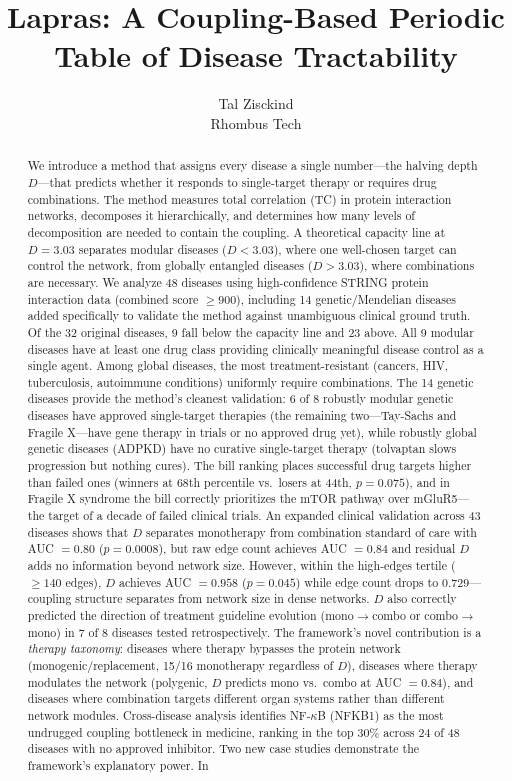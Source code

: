 \documentclass[11pt,a4paper]{article}
\title{\textbf{Lapras: A Coupling-Based Periodic Table of Disease Tractability}}
\author{Tal Zisckind\\Rhombus Tech}
\date{}
\begin{document}
\maketitle

\begin{abstract}
We introduce a method that assigns every disease a single number---the halving depth $D$---that predicts whether it responds to single-target therapy or requires drug combinations. The method measures total correlation (TC) in protein interaction networks, decomposes it hierarchically, and determines how many levels of decomposition are needed to contain the coupling. A theoretical capacity line at $D = 3.03$ separates modular diseases ($D < 3.03$), where one well-chosen target can control the network, from globally entangled diseases ($D > 3.03$), where combinations are necessary. We analyze 48 diseases using high-confidence STRING protein interaction data (combined score $\geq 900$), including 14 genetic/Mendelian diseases added specifically to validate the method against unambiguous clinical ground truth. Of the 32 original diseases, 9 fall below the capacity line and 23 above. All 9 modular diseases have at least one drug class providing clinically meaningful disease control as a single agent. Among global diseases, the most treatment-resistant (cancers, HIV, tuberculosis, autoimmune conditions) uniformly require combinations. The 14 genetic diseases provide the method's cleanest validation: 6 of 8 robustly modular genetic diseases have approved single-target therapies (the remaining two---Tay-Sachs and Fragile X---have gene therapy in trials or no approved drug yet), while robustly global genetic diseases (ADPKD) have no curative single-target therapy (tolvaptan slows progression but nothing cures). The bill ranking places successful drug targets higher than failed ones (winners at 68th percentile vs.\ losers at 44th, $p = 0.075$), and in Fragile X syndrome the bill correctly prioritizes the mTOR pathway over mGluR5---the target of a decade of failed clinical trials. An expanded clinical validation across 43 diseases shows that $D$ separates monotherapy from combination standard of care with AUC $= 0.80$ ($p = 0.0008$), but raw edge count achieves AUC $= 0.84$ and residual $D$ adds no information beyond network size. However, within the high-edges tertile ($\geq 140$ edges), $D$ achieves AUC $= 0.958$ ($p = 0.045$) while edge count drops to $0.729$---coupling structure separates from network size in dense networks. $D$ also correctly predicted the direction of treatment guideline evolution (mono$\to$combo or combo$\to$mono) in 7 of 8 diseases tested retrospectively. The framework's novel contribution is a \emph{therapy taxonomy}: diseases where therapy bypasses the protein network (monogenic/replacement, 15/16 monotherapy regardless of $D$), diseases where therapy modulates the network (polygenic, $D$ predicts mono vs.\ combo at AUC $= 0.84$), and diseases where combination targets different organ systems rather than different network modules. Cross-disease analysis identifies NF-$\kappa$B (NFKB1) as the most undrugged coupling bottleneck in medicine, ranking in the top 30\% across 24 of 48 diseases with no approved inhibitor. Two new case studies demonstrate the framework's explanatory power. In 
\end{abstract}
\end{document}
